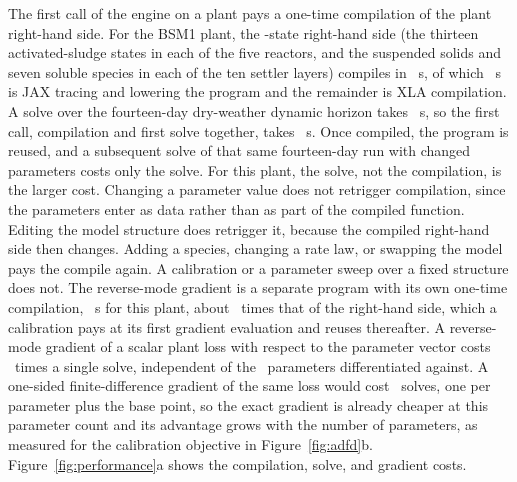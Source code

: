 \documentclass{article}
\begin{document}
The first call of the engine on a plant pays a one-time compilation of the plant right-hand side. For the BSM1 plant, the \PerfNstate-state right-hand side (the thirteen activated-sludge states in each of the five reactors, and the suspended solids and seven soluble species in each of the ten settler layers) compiles in \PerfCompileS~s, of which \PerfTraceS~s is JAX tracing and lowering the program and the remainder is XLA compilation. A solve over the fourteen-day dry-weather dynamic horizon takes \PerfSolveS~s, so the first call, compilation and first solve together, takes \PerfFirstCallS~s. Once compiled, the program is reused, and a subsequent solve of that same fourteen-day run with changed parameters costs only the solve. For this plant, the solve, not the compilation, is the larger cost. Changing a parameter value does not retrigger compilation, since the parameters enter as data rather than as part of the compiled function. Editing the model structure does retrigger it, because the compiled right-hand side then changes. Adding a species, changing a rate law, or swapping the model pays the compile again. A calibration or a parameter sweep over a fixed structure does not. The reverse-mode gradient is a separate program with its own one-time compilation, \PerfGradCompileS~s for this plant, about \PerfGradCompileRatio\ times that of the right-hand side, which a calibration pays at its first gradient evaluation and reuses thereafter. A reverse-mode gradient of a scalar plant loss with respect to the parameter vector costs \PerfADFactor\ times a single solve, independent of the \PerfNparams\ parameters differentiated against. A one-sided finite-difference gradient of the same loss would cost \PerfFDFactor\ solves, one per parameter plus the base point, so the exact gradient is already cheaper at this parameter count and its advantage grows with the number of parameters, as measured for the calibration objective in Figure~\ref{fig:adfd}b. Figure~\ref{fig:performance}a shows the compilation, solve, and gradient costs.
\end{document}
